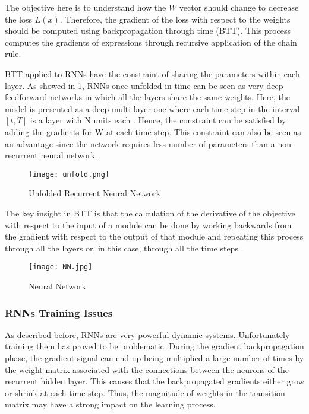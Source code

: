 The objective here is to understand how the $W$ vector should change to decrease the loss $L(x)$. Therefore, the gradient of the loss with respect to the weights should be computed using backpropagation through time (BTT). This process computes the gradients of expressions through recursive application of the chain rule. 

BTT applied to RNNs have the constraint of sharing the parameters within each layer. As showed in  \ref{fig:unfold}, RNNs once unfolded in time can be seen as very deep feedforward networks in which all the layers share the same weights\cite{lecun2015deep}. Here, the model is presented as a deep multi-layer one where each time step in the interval $[t,T]$ is a layer with N units each \cite{pascanu2013difficulty}. Hence, the constraint can be satisfied by adding the gradients for W at each time step. This constraint can also be seen as an advantage since the network requires less number of parameters than a non-recurrent neural network.

\begin{figure}
\label{fig:unfold}
\center
\texttt{[image: unfold.png]}
\caption{Unfolded Recurrent Neural Network}
\end{figure}

The key insight in BTT is that the calculation of the derivative of the objective with respect to the input of a module can be done by working backwards from the gradient with respect to the output of that module and repeating this process through all the layers or, in this case, through all the time steps \cite{schmidhuber2015deep}.

\begin{figure}
\label{fig:bpt}
\center
\texttt{[image: NN.jpg]}
\caption{Neural Network}
\end{figure}

\subsubsection{RNNs Training Issues}
As described before, RNNs are very powerful dynamic systems. Unfortunately training them has proved to be problematic. During the gradient backpropagation phase, the gradient signal can end up being multiplied a large number of times by the weight matrix associated with the connections between the neurons of the recurrent hidden layer. This causes that the backpropagated gradients either grow or shrink at each time step. Thus, the magnitude of weights in the transition matrix may have a strong impact on the learning process.

